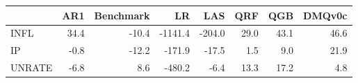 \begin{tabular}{lrrrrrrr}
\toprule
 & AR1 & Benchmark & LR & LAS & QRF & QGB & DMQv0c \\
\midrule
INFL & 34.4 & -10.4 & -1141.4 & -204.0 & 29.0 & 43.1 & 46.6 \\
IP & -0.8 & -12.2 & -171.9 & -17.5 & 1.5 & 9.0 & 21.9 \\
UNRATE & -6.8 & 8.6 & -480.2 & -6.4 & 13.3 & 17.2 & 4.8 \\
\bottomrule
\end{tabular}
